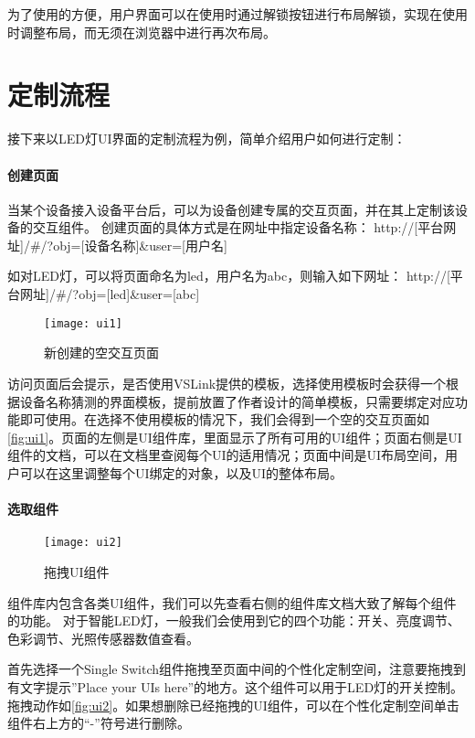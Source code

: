 为了使用的方便，用户界面可以在使用时通过解锁按钮进行布局解锁，实现在使用时调整布局，而无须在浏览器中进行再次布局。

\section{定制流程}
接下来以LED灯UI界面的定制流程为例，简单介绍用户如何进行定制：
\paragraph{创建页面}
当某个设备接入设备平台后，可以为设备创建专属的交互页面，并在其上定制该设备的交互组件。
创建页面的具体方式是在网址中指定设备名称：
http://[平台网址]/\#/?obj=[设备名称]\&user=[用户名]

如对LED灯，可以将页面命名为led，用户名为abc，则输入如下网址：
http://[平台网址]/\#/?obj=[led]\&user=[abc]

\begin{figure}[htb]
	\centering
	\texttt{[image: ui1]}
	\caption{新创建的空交互页面}
	\label{fig:ui1}
\end{figure}

访问页面后会提示，是否使用VSLink提供的模板，选择使用模板时会获得一个根据设备名称猜测的界面模板，提前放置了作者设计的简单模板，只需要绑定对应功能即可使用。在选择不使用模板的情况下，我们会得到一个空的交互页面如\autoref{fig:ui1}。页面的左侧是UI组件库，里面显示了所有可用的UI组件；页面右侧是UI组件的文档，可以在文档里查阅每个UI的适用情况；页面中间是UI布局空间，用户可以在这里调整每个UI绑定的对象，以及UI的整体布局。

\paragraph{选取组件}

\begin{figure}[htb]
	\centering
	\texttt{[image: ui2]}
	\caption{拖拽UI组件}
	\label{fig:ui2}
\end{figure}

组件库内包含各类UI组件，我们可以先查看右侧的组件库文档大致了解每个组件的功能。
对于智能LED灯，一般我们会使用到它的四个功能：开关、亮度调节、色彩调节、光照传感器数值查看。

首先选择一个Single Switch组件拖拽至页面中间的个性化定制空间，注意要拖拽到有文字提示”Place your UIs here”的地方。这个组件可以用于LED灯的开关控制。拖拽动作如\autoref{fig:ui2}。如果想删除已经拖拽的UI组件，可以在个性化定制空间单击组件右上方的“-”符号进行删除。

